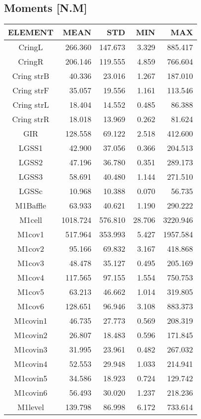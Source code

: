 \subsection{Moments [N.M]}
\begin{longtable}{crrrr}\toprule
 ELEMENT & MEAN & STD & MIN & MAX \\\hline
 CringL & 266.360 & 147.673 & 3.329 & 885.417 \\
 CringR & 206.146 & 119.555 & 4.859 & 766.604 \\
 Cring strB & 40.336 & 23.016 & 1.267 & 187.010 \\
 Cring strF & 35.057 & 19.556 & 1.161 & 113.546 \\
 Cring strL & 18.404 & 14.552 & 0.485 & 86.388 \\
 Cring strR & 18.018 & 13.969 & 0.262 & 81.624 \\
 GIR & 128.558 & 69.122 & 2.518 & 412.600 \\
 LGSS1 & 42.900 & 37.056 & 0.366 & 204.513 \\
 LGSS2 & 47.196 & 36.780 & 0.351 & 289.173 \\
 LGSS3 & 58.691 & 40.480 & 1.144 & 271.510 \\
 LGSSc & 10.968 & 10.388 & 0.070 & 56.735 \\
 M1Baffle & 63.933 & 40.621 & 1.190 & 290.222 \\
 M1cell & 1018.724 & 576.810 & 28.706 & 3220.946 \\
 M1cov1 & 517.964 & 353.993 & 5.427 & 1957.584 \\
 M1cov2 & 95.166 & 69.832 & 3.167 & 418.868 \\
 M1cov3 & 48.478 & 35.127 & 0.495 & 205.169 \\
 M1cov4 & 117.565 & 97.155 & 1.554 & 750.753 \\
 M1cov5 & 63.213 & 46.662 & 1.014 & 319.805 \\
 M1cov6 & 128.651 & 96.946 & 3.108 & 883.373 \\
 M1covin1 & 46.735 & 27.773 & 0.569 & 208.319 \\
 M1covin2 & 26.807 & 18.483 & 0.596 & 171.845 \\
 M1covin3 & 31.995 & 23.961 & 0.482 & 267.032 \\
 M1covin4 & 52.553 & 29.948 & 1.033 & 214.941 \\
 M1covin5 & 34.586 & 18.923 & 0.724 & 129.742 \\
 M1covin6 & 56.493 & 30.020 & 1.237 & 218.236 \\
 M1level & 139.798 & 86.998 & 6.172 & 733.614 \\

\end{longtable}
